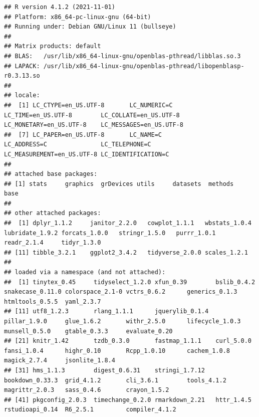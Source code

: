 \documentclass[
  12pt,
  oneside]{book}
\theoremstyle{definition}
\theoremstyle{definition}
\theoremstyle{definition}
\theoremstyle{definition}
\theoremstyle{remark}
\begin{document}
\begin{verbatim}
## R version 4.1.2 (2021-11-01)
## Platform: x86_64-pc-linux-gnu (64-bit)
## Running under: Debian GNU/Linux 11 (bullseye)
## 
## Matrix products: default
## BLAS:   /usr/lib/x86_64-linux-gnu/openblas-pthread/libblas.so.3
## LAPACK: /usr/lib/x86_64-linux-gnu/openblas-pthread/libopenblasp-r0.3.13.so
## 
## locale:
##  [1] LC_CTYPE=en_US.UTF-8       LC_NUMERIC=C               LC_TIME=en_US.UTF-8        LC_COLLATE=en_US.UTF-8     LC_MONETARY=en_US.UTF-8    LC_MESSAGES=en_US.UTF-8   
##  [7] LC_PAPER=en_US.UTF-8       LC_NAME=C                  LC_ADDRESS=C               LC_TELEPHONE=C             LC_MEASUREMENT=en_US.UTF-8 LC_IDENTIFICATION=C       
## 
## attached base packages:
## [1] stats     graphics  grDevices utils     datasets  methods   base     
## 
## other attached packages:
##  [1] dplyr_1.1.2     janitor_2.2.0   cowplot_1.1.1   wbstats_1.0.4   lubridate_1.9.2 forcats_1.0.0   stringr_1.5.0   purrr_1.0.1     readr_2.1.4     tidyr_1.3.0    
## [11] tibble_3.2.1    ggplot2_3.4.2   tidyverse_2.0.0 scales_1.2.1   
## 
## loaded via a namespace (and not attached):
##  [1] tinytex_0.45     tidyselect_1.2.0 xfun_0.39        bslib_0.4.2      snakecase_0.11.0 colorspace_2.1-0 vctrs_0.6.2      generics_0.1.3   htmltools_0.5.5  yaml_2.3.7      
## [11] utf8_1.2.3       rlang_1.1.1      jquerylib_0.1.4  pillar_1.9.0     glue_1.6.2       withr_2.5.0      lifecycle_1.0.3  munsell_0.5.0    gtable_0.3.3     evaluate_0.20   
## [21] knitr_1.42       tzdb_0.3.0       fastmap_1.1.1    curl_5.0.0       fansi_1.0.4      highr_0.10       Rcpp_1.0.10      cachem_1.0.8     magick_2.7.4     jsonlite_1.8.4  
## [31] hms_1.1.3        digest_0.6.31    stringi_1.7.12   bookdown_0.33.3  grid_4.1.2       cli_3.6.1        tools_4.1.2      magrittr_2.0.3   sass_0.4.6       crayon_1.5.2    
## [41] pkgconfig_2.0.3  timechange_0.2.0 rmarkdown_2.21   httr_1.4.5       rstudioapi_0.14  R6_2.5.1         compiler_4.1.2
\end{verbatim}

  
\end{document}
